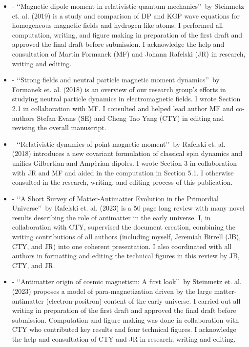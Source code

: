 \begin{itemize}
    \item {} - \lq\lq Magnetic dipole moment in relativistic quantum mechanics\rq\rq\ by Steinmetz et. al. (2019) is a study and comparison of DP and KGP wave equations for homogeneous magnetic fields and hydrogen-like atoms. I performed all computation, writing, and figure making in preparation of the first draft and approved the final draft before submission. I acknowledge the help and consultation of Martin Formanek (MF) and Johann Rafelski (JR) in research, writing and editing.
    \item {} - \lq\lq Strong fields and neutral particle magnetic moment dynamics\rq\rq\ by Formanek et. al. (2018) is an overview of our research group's efforts in studying neutral particle dynamics in electromagnetic fields. I wrote Section 2.1 in collaboration with MF. I consulted and helped lead author MF and co-authors Stefan Evans (SE) and Cheng Tao Yang (CTY) in editing and revising the overall manuscript.
    \item {} - \lq\lq Relativistic dynamics of point magnetic moment\rq\rq\ by Rafelski et. al. (2018) introduces a new covariant formulation of classical spin dynamics and unifies Gilbertian and Amp{\`e}rian dipoles. I wrote Section 3 in collaboration with JR and MF and aided in the computation in Section 5.1. I otherwise consulted in the research, writing, and editing process of this publication. 
    \item {} - \lq\lq A Short Survey of Matter-Antimatter Evolution in the Primordial Universe\rq\rq\ by Rafelski et. al. (2023) is a 50 page long review with many novel results describing the role of antimatter in the early universe. I, in collaboration with CTY,  supervised the document creation, combining the writing contributions of all authors (including myself, Jeremiah Birrell (JB), CTY, and JR) into one coherent presentation. I also coordinated with all authors in formatting and editing the technical figures in this review by JB, CTY, and JR.
    \item {} - \lq\lq Antimatter origin of cosmic magnetism: A first look\rq\rq\ by Steinmetz et. al. (2023) proposes a model of para-magnetization driven by the large matter-antimatter (electron-positron) content of the early universe. I carried out all writing in preparation of the first draft and approved the final draft before submission. Computation and figure making was done in collaboration with CTY who contributed key results and four technical figures. I acknowledge the help and consultation of CTY and JR in research, writing and editing.
\end{itemize}

